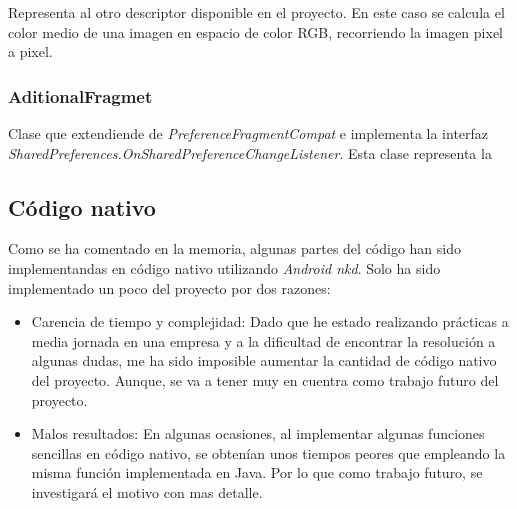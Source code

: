 Representa al otro descriptor disponible en el proyecto. En este caso se calcula el color medio de una imagen en espacio de color RGB, recorriendo la imagen pixel a pixel.

\subsubsection{AditionalFragmet}

Clase que extendiende de \textit{PreferenceFragmentCompat} e implementa la interfaz \textit{SharedPreferences.OnSharedPreferenceChangeListener}. Esta clase representa la

\subsection{Código nativo}

Como se ha comentado en la memoria, algunas partes del código han sido implementandas en código nativo utilizando \textit{Android nkd}. Solo ha sido implementado un poco del proyecto por dos razones:

\begin{itemize}
\item Carencia de tiempo y complejidad: Dado que he estado realizando prácticas a media jornada en una empresa y a la dificultad de encontrar la resolución a algunas dudas, me ha sido imposible aumentar la cantidad de código nativo del proyecto. Aunque, se va a tener muy en cuentra como trabajo futuro del proyecto.

\item Malos resultados: En algunas ocasiones, al implementar algunas funciones sencillas en código nativo, se obtenían unos tiempos peores que empleando la misma función implementada en Java. Por lo que como trabajo futuro, se investigará el motivo con mas detalle. 

\end{itemize} 

